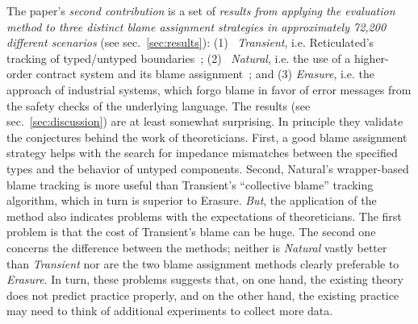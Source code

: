 The paper's {\it second contribution\/} is a set of {\em results from applying
the evaluation method to three distinct blame assignment strategies in
approximately 72,200 different scenarios\/} (see sec.~\ref{sec:results}): (1)~{\it
Transient\/}, i.e. Reticulated's tracking of typed/untyped boundaries~\cite{vss-popl-2017}; (2)~{\it
Natural\/}, i.e. the use of a higher-order contract system and its blame
assignment~\cite{ff-icfp-2002}; and (3) {\it Erasure\/}, i.e. the approach of
industrial systems, which forgo blame in favor of error messages from the safety
checks of the underlying language. The results (see
sec.~\ref{sec:discussion}) are at least somewhat surprising.  In principle
they validate the conjectures behind the work of theoreticians.  First, a good
blame assignment strategy helps with the search for impedance mismatches between
the specified types and the behavior of untyped components.  Second, Natural's
wrapper-based blame tracking is more useful than Transient's ``collective
blame'' tracking algorithm, which in turn is superior to Erasure. {\em But\/},
the application of the method also indicates problems with the expectations of
theoreticians. The first problem is that the cost of Transient's blame can be
huge. The second one concerns the difference between the methods; neither is
{\it Natural\/} vastly better than {\it Transient\/} nor are the two blame
assignment methods clearly preferable to {\it Erasure\/}.  In turn, these
problems suggests that, on one hand, the existing theory does not predict
practice properly, and on the other hand, the existing practice may need to
think of additional experiments to collect more data.
